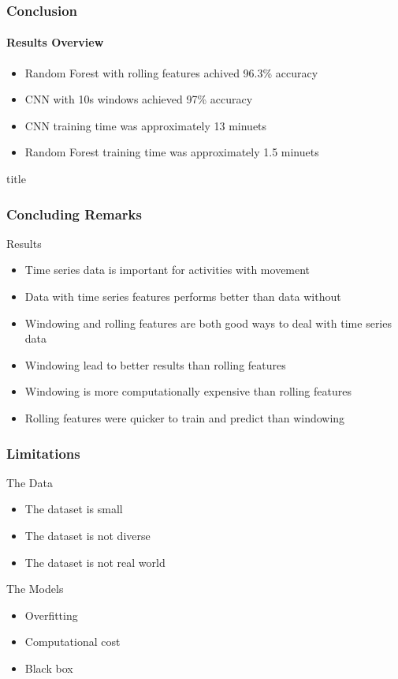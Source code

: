 \documentclass[
	11pt, %
]{beamer}
\begin{document}
\begin{frame}
    \frametitle{Conclusion}    
    \framesubtitle{Results Overview}

    \begin{itemize}
        \item Random Forest with rolling features achived 96.3\% accuracy
        \item CNN with 10s windows achieved 97\% accuracy
        \item CNN training time was approximately 13 minuets
        \item Random Forest training time was approximately 1.5 minuets
    \end{itemize}

\end{frame}

\begin{frame}{title}
    \frametitle{Concluding Remarks}

    \begin{block}{Results}
        \begin{itemize}
            \item Time series data is important for activities with movement
            \item Data with time series features performs better than data without
            \item Windowing and rolling features are both good ways to deal with time series data
            \item Windowing lead to better results than rolling features
            \item Windowing is more computationally expensive than rolling features
            \item Rolling features were quicker to train and predict than windowing
        \end{itemize}
    \end{block}

\end{frame}

\begin{frame}
    \frametitle{Limitations}

    \begin{block}{The Data}
    \begin{itemize}
        \item The dataset is small
        \item The dataset is not diverse
        \item The dataset is not real world
    \end{itemize}
    \end{block}

    \begin{block}{The Models}
    \begin{itemize}
        \item Overfitting
        \item Computational cost 
        \item Black box
    \end{itemize}
    \end{block}

\end{frame}
\end{document}

